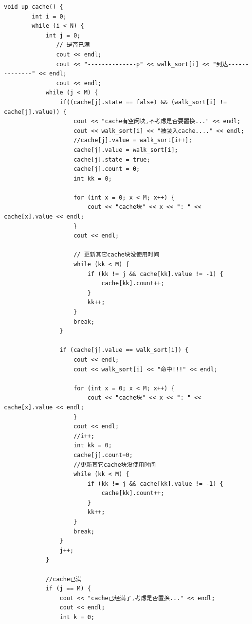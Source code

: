 \documentclass[UTF8,12pt]{article}
\begin{document}
\begin{lstlisting}[frame=shadowbox] 
    void up_cache() {
        int i = 0;
        while (i < N) {
            int j = 0;
               // 是否已满 
               cout << endl;
               cout << "--------------p" << walk_sort[i] << "到达--------------" << endl;
               cout << endl;
            while (j < M) {
                if((cache[j].state == false) && (walk_sort[i] != cache[j].value)) {
                    cout << "cache有空闲块,不考虑是否要置换..." << endl;
                    cout << walk_sort[i] << "被装入cache...." << endl;
                    //cache[j].value = walk_sort[i++]; 
                    cache[j].value = walk_sort[i]; 
                    cache[j].state = true;
                    cache[j].count = 0;
                    int kk = 0;
                    
                    for (int x = 0; x < M; x++) {
                        cout << "cache块" << x << ": " << cache[x].value << endl;
                    }
                    cout << endl;
                    
                    // 更新其它cache块没使用时间
                    while (kk < M) {
                        if (kk != j && cache[kk].value != -1) {
                            cache[kk].count++;
                        }
                        kk++;
                    }
                    break; 
                }
                
                if (cache[j].value == walk_sort[i]) {
                    cout << endl;
                    cout << walk_sort[i] << "命中!!!" << endl;
                    
                    for (int x = 0; x < M; x++) {
                        cout << "cache块" << x << ": " << cache[x].value << endl;
                    }
                    cout << endl;
                    //i++; 
                    int kk = 0;
                    cache[j].count=0;
                    //更新其它cache块没使用时间
                    while (kk < M) {
                        if (kk != j && cache[kk].value != -1) {
                            cache[kk].count++;
                        }
                        kk++;
                    }
                    break;
                }
                j++;
            }
    
            //cache已满 
            if (j == M) {
                cout << "cache已经满了,考虑是否置换..." << endl;
                cout << endl;
                int k = 0;
    

\end{lstlisting}
\end{document}

